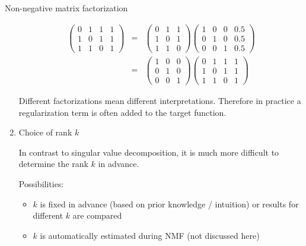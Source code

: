 \begin{vbframe}{Non-negative matrix factorization}
\begin{enumerate}
\begin{eqnarray*}
\begin{pmatrix} 0 & 1 & 1 & 1 \\
1 & 0 & 1 & 1 \\
1 & 1 & 0 & 1 \end{pmatrix} &=& \begin{pmatrix} 0 & 1 & 1  \\
1 & 0 & 1 \\
1 & 1 & 0 \end{pmatrix} \begin{pmatrix} 1 & 0 & 0 & 0.5 \\
0 & 1 & 0 & 0.5 \\
0 & 0 & 1 & 0.5 \end{pmatrix} \\ &=&
\begin{pmatrix} 1 & 0 & 0  \\
0 & 1 & 0 \\
0 & 0 & 1 \end{pmatrix} \begin{pmatrix} 0 & 1 & 1 & 1 \\
1 & 0 & 1 & 1 \\
1 & 1 & 0 & 1 \end{pmatrix}
\end{eqnarray*}

Different factorizations mean different interpretations. Therefore in practice a regularization term is often added to the target function.

\framebreak

\item Choice of rank $k$

\lz

In contrast to singular value decomposition, it is much more difficult to determine the rank $k$ in advance.

\lz

Possibilities:

\begin{itemize}
\item $k$ is fixed in advance (based on prior knowledge / intuition) or results for different $k$ are compared
\item $k$ is automatically estimated during NMF (not discussed here)
\end{itemize}

\end{enumerate}

\end{vbframe}

